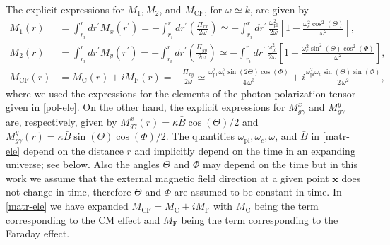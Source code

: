 \documentclass[a4paper,11pt]{article}
\newcommand{\bs}{\boldsymbol}
\begin{document}
The explicit expressions for $M_1, M_2$, and $M_\text{CF}$, for $\omega\simeq k$, are given by
\begin{align}\label{matr-ele}
M_1(r) &=\int_{r_i}^r dr^\prime M_x(r^\prime)=-\int_{r_i}^r dr^\prime \left(\frac{\Pi_{xx}}{2\omega}\right) \simeq -\int_{r_i}^r dr^\prime\, \frac{\omega_\text{pl}^2}{2 \omega}\left[1 - \frac{\omega_c^2 \cos^2(\Theta)}{\omega^2}\right],\nonumber\\
M_2(r) &=\int_{r_i}^r dr^\prime M_y(r^\prime)=-\int_{r_i}^r dr^\prime \left(\frac{\Pi_{yy}}{2\omega}\right) \simeq -\int_{r_i}^r dr^\prime\, \frac{\omega_\text{pl}^2}{2 \omega}\left[1 - \frac{\omega_c^2 \sin^2(\Theta)\cos^2(\Phi)}{\omega^2}\right],\nonumber\\
M_\text{CF}(r) &= M_\text{C}(r)+i M_\text{F}(r)=-\frac{\Pi_{xy}}{2\omega} \simeq \frac{\omega_\text{pl}^2\,\omega_c^2 \sin(2 \Theta)\cos(\Phi)}{4\, \omega^3} + i \frac{\omega_\text{pl}^2\omega_c \sin(\Theta)\sin(\Phi)}{2\,\omega^2},
\end{align}
where we used the expressions for the elements of the photon polarization tensor given in \eqref{pol-ele}. %
On the other hand, the explicit expressions for $M_{g\gamma}^x$ and $M_{g\gamma}^y$ are, respectively, given by $M_{g\gamma}^x(r)=\kappa \bar B \cos(\Theta)/2$ and $M_{g\gamma}^y(r)=\kappa \bar B \sin(\Theta)\cos(\Phi)/2$. The quantities $\omega_\text{pl}, \omega_c, \omega$, and $\bar B$ in \eqref{matr-ele} depend on the distance $r$ and implicitly depend on the time in an expanding universe; see below. Also the angles $\Theta$ and $\Phi$ may depend on the time but in this work we assume that the external magnetic field direction at a given point $\bs x$ does not change in time, therefore $\Theta$ and $\Phi$ are assumed to be constant in time. In \eqref{matr-ele} we have expanded $M_\text{CF}=M_\text{C}+iM_\text{F}$ with $M_\text{C}$ being the term corresponding to the CM effect and $M_\text{F}$ being the term corresponding to the Faraday effect.
\end{document}
